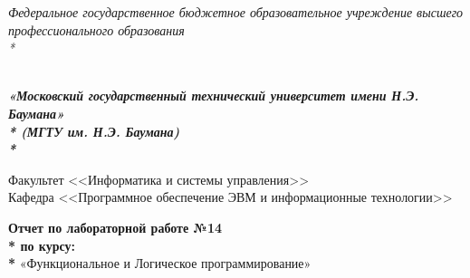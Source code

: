 \newpage
\begin{titlepage}
	\thispagestyle{empty}
	
	{\large
		\begin{center}
			\textsl{Федеральное государственное бюджетное образовательное учреждение высшего профессионального образования \\* }	
			\vspace{2em}
		\end{center}
	}
	{
		\begin{minipage}[t]{0.13\textwidth}
			\centering{}
			\label{fig0}
		\end{minipage}\hfill
		\begin{minipage}[t]{0.65\textwidth}
			\begin{center}
				\large  \textsl{\textbf {\\ «Московский государственный технический университет имени Н.Э. Баумана» \\* (МГТУ им. Н.Э. Баумана) \\* }}
			\end{center}
		\end{minipage}
	}
	
	\vspace{2em}
	
	\hrulefill
	
	\begin{center}
		\vspace{0pt plus2fill} %
		{\large
			Факультет  <<Информатика и системы управления>>\\
			Кафедра  <<Программное обеспечение ЭВМ и информационные технологии>>
		}
	\end{center}
	
	{\Large
		\begin{center}
			\textbf{Отчет по лабораторной работе №14 \\* по курсу: \\* } «Функциональное и Логическое программирование» \\
		\end{center}
	}
	\vspace{0pt plus4fill} %
	

\end{titlepage}
